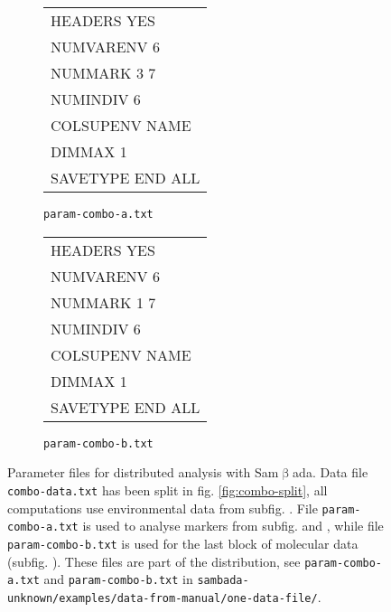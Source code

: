 \documentclass[a4paper,11pt]{article}
\newcommand{\versionnumber}{unknown}
\newcommand{\smb}{\textsf{Sam$\upbeta$ada}}
\newcommand{\pathtodatafrommanual}{\texttt{sambada-\versionnumber/examples/data-from-manual/}}
\newcommand{\pathtoonedatafile}{\pathtodatafrommanual\texttt{one-data-file/}}
\begin{document}
\begin{figure}[htbp]
\centering

\hfill%
\begin{subfigure}{6cm}
\centering
\ttfamily
\begin{tabular}{|l|}
\hline
HEADERS YES\\	
NUMVARENV 6\\	
NUMMARK 3 7	\\
NUMINDIV 6\\
COLSUPENV NAME\\
DIMMAX 1\\
SAVETYPE END ALL\\
\hline
\end{tabular}%
\caption{\texttt{param-combo-a.txt}}
\label{fig:fichier-param-parallele-combo-a}
\end{subfigure}%
\hfill%
\begin{subfigure}{6cm}
\centering
\ttfamily
\begin{tabular}{|l|}
\hline
HEADERS YES\\	
NUMVARENV 6\\	
NUMMARK 1 7	\\
NUMINDIV 6\\
COLSUPENV NAME\\
DIMMAX 1\\
SAVETYPE END ALL\\
\hline
\end{tabular}%
\caption{\texttt{param-combo-b.txt}}
\label{fig:fichier-param-parallele-combo-b}
\end{subfigure}%
\hfill

\caption[Exemple de fichier de paramètres pour \smb.]
{
	Parameter files for distributed analysis with \smb.
	Data file \texttt{combo-data.txt} has been split in fig. \ref{fig:combo-split}, all computations use environmental data from subfig. \emph{}.
	File \texttt{param-combo-a.txt} is used to analyse markers from subfig. \emph{} and \emph{}, while file \texttt{param-combo-b.txt} is used for the last block of molecular data (subfig. \emph{}).
	These files are part of the distribution, see \texttt{param-combo-a.txt} and \texttt{param-combo-b.txt} in \pathtoonedatafile.
}
\label{fig:fichier-param-parallele-combo}
\end{figure}
\end{document}
